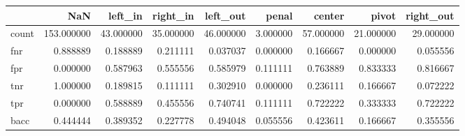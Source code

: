 \begin{tabular}{lrrrrrrrr}
\toprule
{} &         NaN &    left\_in &   right\_in &   left\_out &     penal &     center &      pivot &  right\_out \\
\midrule
count &  153.000000 &  43.000000 &  35.000000 &  46.000000 &  3.000000 &  57.000000 &  21.000000 &  29.000000 \\
fnr   &    0.888889 &   0.188889 &   0.211111 &   0.037037 &  0.000000 &   0.166667 &   0.000000 &   0.055556 \\
fpr   &    0.000000 &   0.587963 &   0.555556 &   0.585979 &  0.111111 &   0.763889 &   0.833333 &   0.816667 \\
tnr   &    1.000000 &   0.189815 &   0.111111 &   0.302910 &  0.000000 &   0.236111 &   0.166667 &   0.072222 \\
tpr   &    0.000000 &   0.588889 &   0.455556 &   0.740741 &  0.111111 &   0.722222 &   0.333333 &   0.722222 \\
bacc  &    0.444444 &   0.389352 &   0.227778 &   0.494048 &  0.055556 &   0.423611 &   0.166667 &   0.355556 \\
\bottomrule
\end{tabular}
